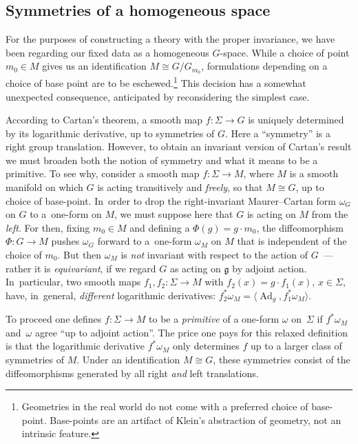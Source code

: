 \documentclass[10pt,a4paper]{amsart}
\numberwithin{equation}{section}
\DeclareMathOperator{\Adjoint}{Ad}
\begin{document}
\subsection*{Symmetries of a homogeneous space}

For the purposes of constructing a theory with the proper invariance,
we have been regarding our fixed data as a homogeneous
$G$-space. While a choice of point $m_0 \in M$ gives us an
identification $M \cong G/G_{m_0}$, formulations depending on a choice
of base point are to be eschewed.\footnote{Geometries in the real
 world do not come with a preferred choice of base-point. Base-points
 are an artifact of Klein's abstraction of geometry, not an intrinsic
 feature.} This decision has a somewhat unexpected consequence,
anticipated by reconsidering the simplest case.

According to Cartan's theorem, a smooth map $f \colon \Sigma
\rightarrow G$ is uniquely determined by its logarithmic derivative,
up to symmetries of $G$. Here a ``symmetry'' is a right group
translation. However, to obtain an invariant version of Cartan's
result we must broaden both the notion of symmetry and what it means
to be a primitive. To see why, consider a smooth map $f \colon \Sigma
\rightarrow M$, where $ M$ is a smooth manifold on which $G$ is acting
transitively and {\em freely}, so that $M \cong G$, up to choice of
base-point. In~order to drop the right-invariant Maurer--Cartan form
$\omega_G$ on $G$ to a~one-form on $ M$, we must suppose here that $G$
is acting on $ M$ from the {\em left}. For then, fixing $ m_0 \in M$
and defining a $\Phi(g) = g \cdot m_0 $, the diffeomorphism $\Phi
\colon G \rightarrow M$ pushes $\omega_G$ forward to a~one-form
$\omega_M $ on $M$ that is independent of the choice of $ m_0$. But
then $\omega_M$ is {\em not} invariant with respect to the action of
$G$~--- rather it is {\em equivariant}, if we regard $G$ as acting on
${\mathfrak g} $ by adjoint action. In~particular, two smooth maps
$f_1, f_2 \colon \Sigma \rightarrow M$ with $f_2(x)=g \cdot f_1(x)$,
$x \in \Sigma $, have, in~general, {\em different} logarithmic
derivatives: $f_2^*\omega_M = \langle\Adjoint_g,f_1^* \omega_M\rangle
$.

To proceed one defines $f \colon \Sigma \rightarrow M$ to be a {\it primitive} of a one-form $\omega $ on~$\Sigma $ if $f^*\omega_M $ and~$\omega $ agree ``up to adjoint action''. The price one pays for this
relaxed definition is that the logarithmic derivative $f^* \omega_M $
only determines $f$ up to a larger class of symmetries of $M$. Under
an identification $M \cong G$, these symmetries consist of the
diffeomorphisms generated by all right {\em and} left translations.
\end{document}
